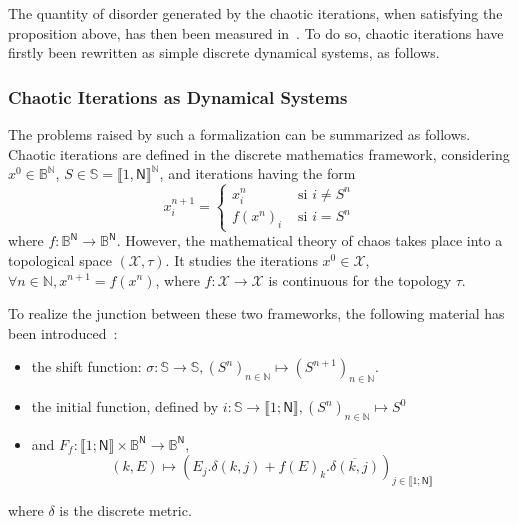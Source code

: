 The quantity of disorder generated by the chaotic iterations, when
satisfying the proposition above, has then been measured in~\cite{GuyeuxThese10}. To do so, 
chaotic iterations have firstly been rewritten as simple discrete 
dynamical systems, as follows.


\subsubsection{Chaotic Iterations as Dynamical Systems}

The problems raised by such a formalization can be summarized as 
follows. 
Chaotic iterations are defined in the discrete mathematics framework,
considering $x^0 \in \mathds{B}^\mathds{N}$, $S \in \mathds{S} = \llbracket 1,\mathsf{N}\rrbracket^\mathds{N}$, and iterations having the
form 
$$x_i^{n+1} = \left\{ \begin{array}{ll} x^{n}_{i} & \textrm{ si } i \neq S^n\\ f(x^{n})_{i} & \textrm{ si } i = S^n \end{array} \right.$$ 
where $f: \mathds{B}^\mathsf{N} \to \mathds{B}^\mathsf{N}$.
However, the mathematical theory of chaos takes place into a 
topological space $(\mathcal{X},\tau)$. It studies the iterations
$x^0 \in \mathcal{X}$, $\forall n \in \mathds{N}, x^{n+1} = f(x^n)$,
where $f : \mathcal{X} \to \mathcal{X}$ is continuous for the
topology $\tau$.

To realize the junction between these two frameworks, the following
material has been introduced~\cite{GuyeuxThese10,wang2009}:
\begin{itemize}
\item the shift function: $\sigma : \mathds{S} \longrightarrow \mathds{S}, (S^n)_{n \in \mathds{N}} \mapsto (S^{n+1})_{n \in \mathds{N}}$.
\item the initial function, defined by $i : \mathds{S} \longrightarrow \llbracket 1 ; \mathsf{N} \rrbracket, (S^n)_{n \in \mathds{N}} \mapsto S^0$
\item and $F_f : \llbracket 1 ; \mathsf{N} \rrbracket \times \mathds{B}^\mathsf{N} \longrightarrow \mathds{B}^\mathsf{N},$ $$(k,E) \longmapsto  \left( E_j.\delta(k,j) + f(E)_k.\overline{\delta (k,j)} \right)_{j \in \llbracket 1 ; \mathsf{N} \rrbracket}$$
\end{itemize}
where $\delta$ is the discrete metric.




